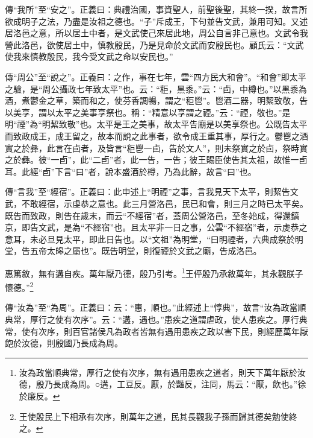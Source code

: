 {\noindent\zhuan{}\fzbyks 傳“我所”至“安之”。正義曰：典禮治國，事資聖人，前聖後聖，其終一揆，故言所欲成明子之法，乃盡是汝祖之德也。“子”斥成王，下句並告文武，兼用可知。又述居洛邑之意，所以居土中者，是文武使己來居此地，周公自言非己意也。文武令我營此洛邑，欲使居土中，慎教殷民，乃是見命於文武而安殷民也。顧氏云：“文武使我來慎教殷民，我今受文武之命以安民也。” \par}

{\noindent\zhuan{}\fzbyks 傳“周公”至“說之”。正義曰：之作，事在七年，雲“四方民大和會”。“和會”即太平之驗，是“周公攝政七年致太平”也。云：“秬，黑黍。”云：“卣，中樽也。”以黑黍為酒，煮鬱金之草，築而和之，使芬香調暢，謂之“秬鬯”。鬯酒二器，明絜致敬，告以美享，謂以太平之美事享祭也。稱：“精意以享謂之禋。”云：“禋，敬也。”是明“禋”為“明絜致敬”也。太平是王之美事，故太平告廟是以美享祭也。公既告太平而致政成王，成王留之，故本而說之此事者，欲令成王重其事，厚行之。鬱鬯之酒實之於彝，此言在卣者，及皆言“秬鬯一卣，告於文人”，則未祭實之於卣，祭時實之於彝。彼“一卣”，此“二卣”者，此一告，一告；彼王賜臣使告其太祖，故惟一卣耳。此經“卣”下言“曰”者，說本盛酒於樽，乃為此辭，故言“曰”也。 \par}

{\noindent\zhuan{}\fzbyks 傳“言我”至“經宿”。正義曰：此申述上“明禋”之事，言我見天下太平，則絜告文武，不敢經宿，示虔恭之意也。此三月營洛邑，民已和會，則三月之時已太平矣。既告而致政，則告在歲末，而云“不經宿”者，蓋周公營洛邑，至冬始成，得還鎬京，即告文武，是為“不經宿”也。且太平非一日之事，公雲“不經宿”者，示虔恭之意耳，未必旦見太平，即此日告也。以“文祖”為明堂，“曰明禋者，六典成祭於明堂，告五帝太皞之屬也”。既告明堂，則復禋於文武之廟，告成洛邑。 \par}

惠篤敘，無有遘自疾。萬年厭乃德，殷乃引考。\footnote{汝為政當順典常，厚行之使有次序，無有遇用患疾之道者，則天下萬年厭於汝德，殷乃長成為周。○遘，工豆反。厭，於豔反，注同，馬云：“厭，飲也。”徐於廉反。}王伻殷乃承敘萬年，其永觀朕子懷德。”\footnote{王使殷民上下相承有次序，則萬年之道，民其長觀我子孫而歸其德矣勉使終之。}

{\noindent\zhuan{}\fzbyks 傳“汝為”至“為周”。正義曰：云：“惠，順也。”此經述上“惇典”，故言“汝為政當順典常，厚行之使有次序”。云：“遘，遇也。”患疾之道謂虐政，使人患疾之。厚行典常，使有次序，則百官諸侯凡為政者皆無有遇用患疾之政以害下民，則經歷萬年厭飽於汝德，則殷國乃長成為周。 \par}

